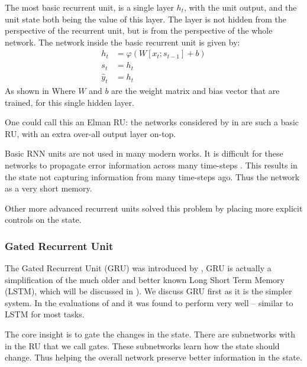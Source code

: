 \documentclass[12pt,parskip]{komatufte}\right
\begin{document}
The most basic recurrent unit, is a single layer $h_t$, with the unit output, and the unit state both being the value of this layer.
The layer is not hidden from the perspective of the recurrent unit, but is from the perspective of the whole network.
The network inside the basic recurrent unit is given by:
\begin{align}
h_t &= \varphi\left(W[x_t; s_{t-1}]+ b \right)\\
s_t & = h_t \\
\hat{y}_t &= h_t
\end{align}
As shown in 
Where $W$ and $b$ are the weight matrix and bias vector that are trained, for this single hidden layer.

One could call this an Elman RU:
the networks considered by in  are such a basic RU, with an extra over-all output layer on-top.

Basic RNN units are not used in many modern works.
It is difficult for these networks to propagate error information across many time-steps .
This results in the state not capturing information from many time-steps ago.
Thus the network as a very short memory.

Other more advanced recurrent units solved this problem by placing more explicit controls on the state.

\subsubsection{Gated Recurrent Unit}
The Gated Recurrent Unit (GRU) was introduced by ,
GRU is actually a simplification of the much older and better known Long Short Term Memory (LSTM),
which will be discussed in ).
We discuss GRU first as it is the simpler system.
In the evaluations of  and  it was found to perform very well -- similar to LSTM for most tasks.

The core insight is to gate the changes in the state.
There are subnetworks with in the RU that we call gates.
These subnetworks learn how the state should change.
Thus helping the overall network preserve better information in the state.
\end{document}
